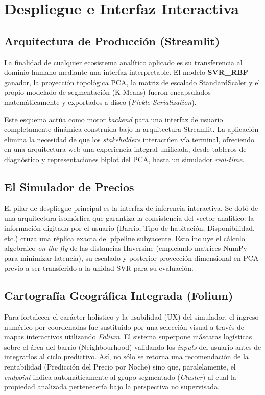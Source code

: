 \chapter{Despliegue e Interfaz Interactiva}

\section{Arquitectura de Producción (Streamlit)}
La finalidad de cualquier ecosistema analítico aplicado es su transferencia al dominio humano mediante una interfaz interpretable. El modelo \textbf{SVR\_RBF} ganador, la proyección topológica PCA, la matriz de escalado StandardScaler y el propio modelado de segmentación (K-Means) fueron encapsulados matemáticamente y exportados a disco (\textit{Pickle Serialization}).

Este esquema actúa como motor \textit{backend} para una interfaz de usuario completamente dinámica construida bajo la arquitectura Streamlit. La aplicación elimina la necesidad de que los \textit{stakeholders} interactúen vía terminal, ofreciendo en una arquitectura web una experiencia integral unificada, desde tableros de diagnóstico y representaciones biplot del PCA, hasta un simulador \textit{real-time}.

\section{El Simulador de Precios}
El pilar de despliegue principal es la interfaz de inferencia interactiva. Se dotó de una arquitectura isomórfica que garantiza la consistencia del vector analítico: la información digitada por el usuario (Barrio, Tipo de habitación, Disponibilidad, etc.) cruza una réplica exacta del pipeline subyacente. 
Esto incluye el cálculo algebraico \textit{on-the-fly} de las distancias Haversine (empleando matrices NumPy para minimizar latencia), su escalado y posterior proyección dimensional en PCA previo a ser transferido a la unidad SVR para su evaluación.

\section{Cartografía Geográfica Integrada (Folium)}
Para fortalecer el carácter holístico y la usabilidad (UX) del simulador, el ingreso numérico por coordenadas fue sustituido por una selección visual a través de mapas interactivos utilizando \textit{Folium}. 
El sistema superpone máscaras logísticas sobre el área del barrio (Neighbourhood) validando los \textit{inputs} del usuario antes de integrarlos al ciclo predictivo. Así, no sólo se retorna una recomendación de la rentabilidad (Predicción del Precio por Noche) sino que, paralelamente, el \textit{endpoint} indica automáticamente al grupo segmentado (\textit{Cluster}) al cual la propiedad analizada pertenecería bajo la perspectiva no supervisada.

